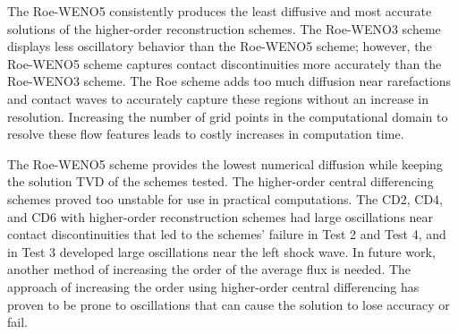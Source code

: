 The Roe-WENO5 consistently produces the least diffusive and most accurate solutions of the higher-order reconstruction schemes. The Roe-WENO3 scheme displays less oscillatory behavior than the Roe-WENO5 scheme; however, the Roe-WENO5 scheme captures contact discontinuities more accurately than the Roe-WENO3 scheme.  The Roe scheme adds too much diffusion near rarefactions and contact waves to accurately capture these regions without an increase in resolution. Increasing the number of grid points in the computational domain to resolve these flow features leads to costly increases in computation time.

The Roe-WENO5 scheme provides the lowest numerical diffusion while keeping the solution TVD of the schemes tested. The higher-order central differencing schemes proved too unstable for use in practical computations. The CD2, CD4, and CD6 with higher-order reconstruction schemes had large oscillations near contact discontinuities that led to the schemes' failure in Test 2 and Test 4, and in Test 3 developed large oscillations near the left shock wave. In future work, another method of increasing the order of the average flux is needed. The approach of increasing the order using higher-order central differencing has proven to be prone to oscillations that can cause the solution to lose accuracy or fail.